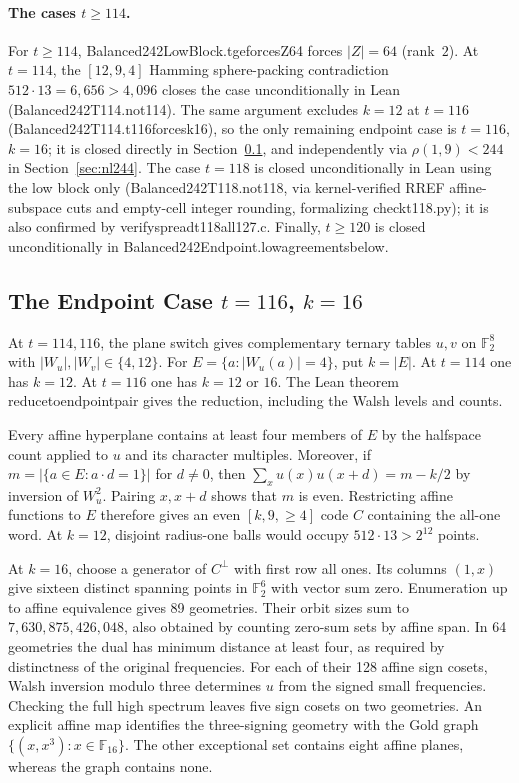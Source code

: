 \documentclass[11pt]{article}
\theoremstyle{definition}
\newcommand{\F}{\mathbb{F}}
\newcommand{\code}[1]{{\ttfamily\small\renewcommand{\_}{\textunderscore\allowbreak}#1}}
\begin{document}
\paragraph{The cases $t \ge 114$.}
For $t \ge 114$, \code{Balanced242LowBlock.t\_ge\_114\_forces\_Z64} forces $|Z| = 64$ (rank~$2$).
At $t = 114$, the $[12,9,4]$ Hamming sphere-packing contradiction $512 \cdot 13 = 6{,}656 > 4{,}096$ closes the case unconditionally in Lean (\code{Balanced242T114.no\_t114}). The same argument excludes $k = 12$ at $t = 116$ (\code{Balanced242T114.t116\_forces\_k16}), so the only remaining endpoint case is $t = 116$, $k = 16$; it is closed directly in Section~\ref{sec:direct-endpoints}, and independently via $\rho(1,9) < 244$ in Section~\ref{sec:nl244}.
The case $t = 118$ is closed unconditionally in Lean using the low block only (\code{Balanced242T118.no\_t118}, via kernel-verified RREF affine-subspace cuts and empty-cell integer rounding, formalizing \code{check\_t118.py}); it is also confirmed by \code{verify\_spread\_t118\_all127.c}.
Finally, $t \ge 120$ is closed unconditionally in \code{Balanced242Endpoint.low\_agreements\_below\_120}.

\subsection{The Endpoint Case $t = 116$, $k = 16$}
\label{sec:direct-endpoints}

At $t=114,116$, the plane switch gives complementary ternary tables $u,v$ on $\F_2^8$ with $|W_u|,|W_v|\in\{4,12\}$. For $E=\{a:|W_u(a)|=4\}$, put $k=|E|$. At $t=114$ one has $k=12$. At $t=116$ one has $k=12$ or $16$. The Lean theorem \code{reduce\_to\_endpoint\_pair} gives the reduction, including the Walsh levels and counts.

Every affine hyperplane contains at least four members of $E$ by the halfspace count applied to $u$ and its character multiples. Moreover, if $m=|\{a\in E:a\cdot d=1\}|$ for $d\ne0$, then $\sum_x u(x)u(x+d)=m-k/2$ by inversion of $W_u^2$. Pairing $x,x+d$ shows that $m$ is even. Restricting affine functions to $E$ therefore gives an even $[k,9,\ge4]$ code $C$ containing the all-one word. At $k=12$, disjoint radius-one balls would occupy $512\cdot13>2^{12}$ points.

At $k=16$, choose a generator of $C^\perp$ with first row all ones. Its columns $(1,x)$ give sixteen distinct spanning points in $\F_2^6$ with vector sum zero. Enumeration up to affine equivalence gives 89 geometries. Their orbit sizes sum to $7{,}630{,}875{,}426{,}048$, also obtained by counting zero-sum sets by affine span. In 64 geometries the dual has minimum distance at least four, as required by distinctness of the original frequencies. For each of their 128 affine sign cosets, Walsh inversion modulo three determines $u$ from the signed small frequencies. Checking the full high spectrum leaves five sign cosets on two geometries. An explicit affine map identifies the three-signing geometry with the Gold graph $\{(x,x^3):x\in\F_{16}\}$. The other exceptional set contains eight affine planes, whereas the graph contains none.
\end{document}
